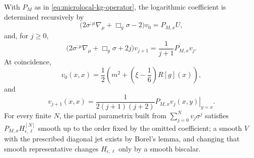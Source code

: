 \begin{theorem}
\label{thm:microlocal-hadamard-recursion}
With \(P_M\) as in \eqref{eq:microlocal-kg-operator}, the logarithmic
coefficient is determined recursively by
\begin{equation}
  \bigl(2\sigma^{;\mu}\nabla_\mu+\Box_g\sigma-2\bigr)v_0
  =
  P_{M,x}U ,
  \label{eq:microlocal-v0-transport}
\end{equation}
and, for \(j\geq0\),
\begin{equation}
  \bigl(2\sigma^{;\mu}\nabla_\mu+\Box_g\sigma+2j\bigr)v_{j+1}
  =
  \frac1{j+1}P_{M,x}v_j .
  \label{eq:microlocal-vj-transport}
\end{equation}
At coincidence,
\begin{equation}
  v_0(x,x)
  =
  \frac12\left(m^2+\left(\xi-\frac16\right)R[g](x)\right),
  \label{eq:microlocal-v0-coincidence}
\end{equation}
and
\begin{equation}
  v_{j+1}(x,x)
  =
  \frac{1}{2(j+1)(j+2)}
  \left.P_{M,x}v_j(x,y)\right|_{y=x}.
  \label{eq:microlocal-vj-coincidence}
\end{equation}
For every finite \(N\), the partial parametrix built from
\(\sum_{j=0}^{N}v_j\sigma^j\) satisfies \(P_{M,x}H_{\epsilon,\ell}^{[N]}\)
smooth up to the order fixed by the omitted coefficient; a smooth \(V\) with
the prescribed diagonal jet exists by Borel's lemma, and changing that smooth
representative changes \(H_{\epsilon,\ell}\) only by a smooth biscalar.
\end{theorem}

